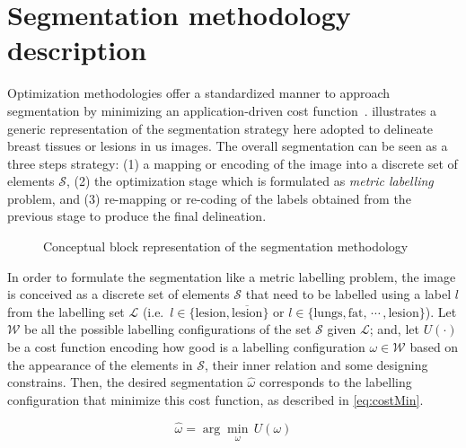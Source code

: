 \graphicspath{ {./content/method/figures/} }

\section{Segmentation methodology description} 

Optimization methodologies offer a standardized manner to approach segmentation by minimizing an application-driven cost function~\cite{cremers2007review}.
 illustrates a generic representation of the segmentation strategy here adopted to delineate breast tissues or lesions in \ac{us} images. 
The overall segmentation can be seen as a three steps strategy: 
(1) a mapping or encoding of the image into a discrete set of elements $\mathcal{S}$, 
(2) the optimization stage which is formulated as \emph{metric labelling} problem, 
and (3) re-mapping or re-coding of the labels obtained from the previous stage to produce the final delineation. 

\begin{figure}[htpb]
  \centering
  \caption{Conceptual block representation of the segmentation methodology}
  \label{fig:method}
\end{figure}

In order to formulate the segmentation like a metric labelling problem, the image is conceived as a discrete set of elements $\mathcal{S}$ that need to be labelled using a label $l$ from the labelling set $\mathcal{L}$ 
(i.e.\, $l \in \{\text{lesion}, \overline{\text{lesion}}\}$ 
or $l \in \{\text{lungs}, \text{fat},\,\cdots\,, \text{lesion}\}$).
Let $\mathcal{W}$ be all the possible labelling configurations of the set $\mathcal{S}$ given $\mathcal{L}$; and, let $U(\cdot)$ be a cost function encoding how good is a labelling configuration $\omega \in \mathcal{W}$ based on the appearance of the elements in $\mathcal{S}$, their inner relation and some designing constrains.
Then, the desired segmentation $\hat{\omega}$ corresponds to the labelling configuration that minimize this cost function, as described in \cref{eq:costMin}.

\begin{equation}
\hat{\omega} = \arg \min_{\substack{\omega}} \,U(\omega)
\label{eq:costmin}
\end{equation}

